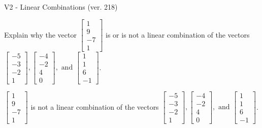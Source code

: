 \begin{exercise}
  \begin{exerciseTitle}V2 - Linear Combinations (ver. 218)\end{exerciseTitle}
  \begin{exerciseStatement}
    Explain why the vector \(\left[\begin{array}{c}
1 \\
9 \\
-7 \\
1
\end{array}\right]\)  is or is not a linear 
	combination of the vectors \(\left[\begin{array}{c}
-5 \\
-3 \\
-2 \\
1
\end{array}\right] , \left[\begin{array}{c}
-4 \\
-2 \\
4 \\
0
\end{array}\right] , \text{ and } \left[\begin{array}{c}
1 \\
1 \\
6 \\
-1
\end{array}\right]\).
	


  \end{exerciseStatement}
  \begin{exerciseAnswer}
   \(\left[\begin{array}{c}
1 \\
9 \\
-7 \\
1
\end{array}\right]\) 
  	 is not  
	a linear combination of the vectors \(\left[\begin{array}{c}
-5 \\
-3 \\
-2 \\
1
\end{array}\right] , \left[\begin{array}{c}
-4 \\
-2 \\
4 \\
0
\end{array}\right] , \text{ and } \left[\begin{array}{c}
1 \\
1 \\
6 \\
-1
\end{array}\right]\).

	
  


  \end{exerciseAnswer}
\end{exercise}